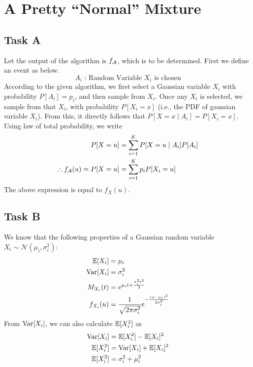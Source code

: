\section{A Pretty ``Normal'' Mixture}
\subsection*{Task A}
Let the output of the algorithm is $f_{\cal{A}}$, which is to be determined.
First we define an event as below.
\[A_i\text{ : Random Variable }X_i\text{ is chosen}\]
According to the given algorithm, we first select a Gaussian variable $X_i$ with probability $P[A_i]=p_i$, and then sample from $X_i$.
Once any $X_i$ is selected, we sample from that $X_i$, with probability $P[X_i = x]$ (i.e., the PDF of gaussian variable $X_i$). From this, it directly follows that $P[X=x\mid A_i] = P[X_i = x]$.
Using law of total probability, we write
\begin{align*}
	P[X=u]                             & = \sum_{i=1}^K P[X=u\mid A_i]P[A_i] \\
	\therefore f_{\cal{A}}(u) = P[X=u] & = \sum_{i=1}^K p_i P[X_i=u]
\end{align*}
The above expression is equal to $f_X(u)$.

\subsection*{Task B}
\begin{remark}
	We know that the following properties of a Gaussian random variable $X_i \sim \mathcal{N}(\mu_i, \sigma_i^2)$:
	\begin{align}
		\operatorname{\mathbb{E}}[X_i]   & = \mu_i \label{eqn:E1}                                                               \\
		\operatorname{Var}[X_i]  & = \sigma_i^2 \label{eqn:V1}                                                          \\
		M_{X_i}(t) & = e^{\mu_i t + \frac{\sigma_i^2 t^2}{2}} \label{eqn:M1}                              \\
		f_{X_i}(u) & = \frac{1}{\sqrt{2\pi\sigma_i^2}}e^{-\frac{(u-\mu_i)^2}{2\sigma_i^2}} \label{eqn:F1}
	\end{align}
	From $\operatorname{Var}[X_i]$, we can also calculate $\operatorname{\mathbb{E}}[X_i^2]$ as
	\begin{align}
		\operatorname{Var}[X_i]  & = \operatorname{\mathbb{E}}[X_i^2] - \operatorname{\mathbb{E}}[X_i]^2 \nonumber \\
		\operatorname{\mathbb{E}}[X_i^2] & = \operatorname{Var}[X_i] + \operatorname{\mathbb{E}}[X_i]^2 \nonumber  \\
		\operatorname{\mathbb{E}}[X_i^2] & = \sigma_i^2 + \mu_i^2
	\end{align}
\end{remark}

